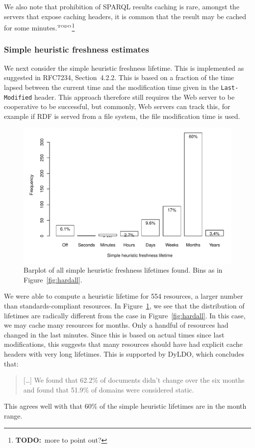 \documentclass{llncs}
\newcommand{\httph}[1]{\texttt{#1}}
\newcommand{\todo}[1]{\ensuremath{^{\textrm{\tiny{TODO}\normalsize}}}\footnote{\textbf{TODO:}~#1}}
\begin{document}
We also note that prohibition of SPARQL results caching is rare,
amongst the servers that expose caching headers, it is common
that the result may be cached for some minutes.\todo{more to point
  out?}

\subsubsection{Simple heuristic freshness estimates}\label{sec:simplefresh}

We next consider the simple heuristic freshness lifetime. This is
implemented as suggested in RFC7234, Section~4.2.2. This is based on a
fraction of the time lapsed between the current time and the
modification time given in the \httph{Last-Modified} header. This
approach therefore still requires the Web server to be cooperative to
be successful, but commonly, Web servers can track this, for example
if RDF is served from a file system, the file modification time is used.


\begin{figure}[th!]
  \centerline{%
    \includegraphics[width=.9\textwidth]{heuristicall.pdf}}
  \caption{Barplot of all simple heuristic freshness lifetimes
    found. Bins as in Figure~\ref{fig:hardall}.}
  \label{fig:heuristicall}
\end{figure}

We were able to compute a heuristic lifetime for 554 resources, a
larger number than standards-compliant resources. In
Figure~\ref{fig:heuristicall}, we see that the distribution of
lifetimes are radically different from the case in
Figure~\ref{fig:hardall}. In this case, we may cache many resources
for months. Only a handful of resources had changed in the last
minutes. Since this is based on actual times since last modifications,
this suggests that many resources should have had explicit cache
headers with very long lifetimes. This is supported by
DyLDO\cite{dyldo2}, which concludes that:
\begin{quote}
[\ldots] We found that 62.2\% of documents didn’t change over the six
months and found that 51.9\% of domains were considered static.
\end{quote}
This agrees well with that 60\% of the simple heuristic lifetimes are
in the month range. 
\end{document}
